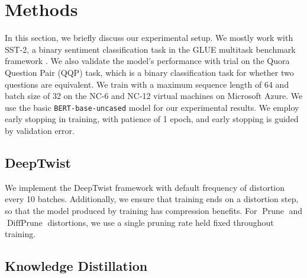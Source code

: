 \documentclass[10pt]{article}
\newcommand{\prune}{\operatorname{Prune}}
\newcommand{\diffprune}{\operatorname{DiffPrune}}
\begin{document}








\section{Methods}
In this section, we briefly discuss our experimental setup. We mostly
work with
SST-2, a binary sentiment classification task in the GLUE multitask benchmark
framework \citep{wang2018glue}. We also validate the model's
performance with trial on the Quora Question Pair (QQP) task, which is a
binary classification task for whether two questions are equivalent. We
train with a maximum sequence length of 64 and batch size of 32 on the
NC-6 and NC-12 virtual machines on Microsoft Azure. We use the basic 
\texttt{BERT-base-uncased} model for our experimental results. We employ
early stopping in training, with patience of 1 epoch, and early stopping is
guided by validation error. 

\subsection{DeepTwist}
We implement the DeepTwist framework with default frequency of distortion
every 10 batches. Additionally, we ensure that training ends on a
distortion step, so that the model produced by training has compression
benefits. For $\prune$ and $\diffprune$ distortions, we use a single
pruning rate held fixed throughout training. 


\subsection{Knowledge Distillation}
\end{document}
